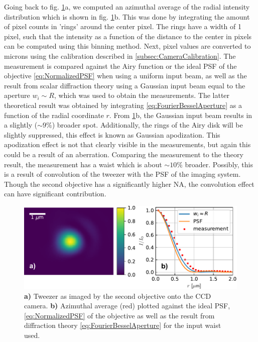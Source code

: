 Going back to fig. \ref{fig:2Dresults}a, we computed an azimuthal average of the radial intensity distribution which is shown in fig. \ref{fig:2Dresults}b.
This was done by integrating the amount of pixel counts in 'rings' around the center pixel.
The rings have a width of 1 pixel, such that the intensity as a function of the distance to the center in pixels can be computed using this binning method.
Next, pixel values are converted to microns using the calibration described in \cref{subsec:CameraCalibration}.
The measurement is compared against the Airy function or the ideal \ac{PSF} of the objective \cref{eq:NormalizedPSF} when using a uniform input beam, as well as the result from scalar diffraction theory using a Gaussian input beam equal to the aperture $w_i \sim R$, which was used to obtain the measurements.
The latter theoretical result was obtained by integrating \cref{eq:FourierBesselAperture} as a function of the radial coordinate $r$.
From \ref{fig:2Dresults}b, the Gaussian input beam results in a slightly ($\sim 9\%$) broader spot.
Additionally, the rings of the Airy disk will be slightly suppressed, this effect is known as Gaussian apodization.
This apodization effect is not that clearly visible in the measurements, but again this could be a result of an aberration.
Comparing the measurement to the theory result, the measurement has a waist which is about $\sim 10\%$ broader. Possibly, this is a result of convolution of the tweezer with the \ac{PSF} of the imaging system. Though the second objective has a significantly higher NA, the convolution effect can have significant contribution.

\begin{figure}
    \centering
    \includegraphics[width=\linewidth]{figures/AzimuthalAverageSpotZoomed.pdf}
    \caption{\textbf{a)} Tweezer as imaged by the second objective onto the CCD camera. 
	\textbf{ b)} Azimuthal average (red) plotted against the ideal \ac{PSF}, \cref{eq:NormalizedPSF} of the objective as well as the result from diffraction theory \cref{eq:FourierBesselAperture} for the input waist used.}
    \label{fig:2Dresults}
\end{figure}


